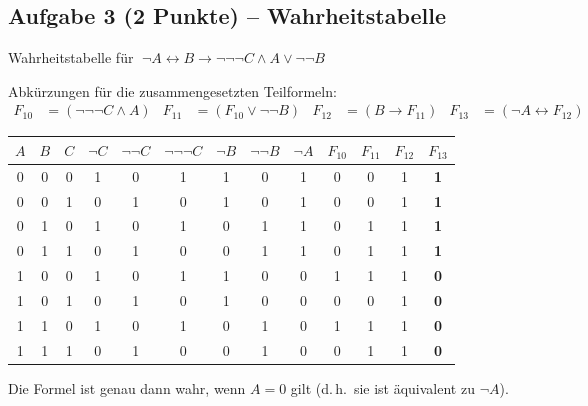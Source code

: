 \documentclass[a4paper,12pt]{article}
\begin{document}
\begin{landscape}
\subsection*{Aufgabe 3 \textnormal{(2 Punkte)} -- Wahrheitstabelle}

Wahrheitstabelle f\"ur
$\;\neg A \leftrightarrow B \to \neg\neg\neg C \wedge A \vee \neg\neg B$

\medskip
Abk\"urzungen f\"ur die zusammengesetzten Teilformeln:
\begin{align*}
F_{10} &= (\neg\neg\neg C \wedge A) &
F_{11} &= (F_{10} \vee \neg\neg B) &
F_{12} &= (B \to F_{11}) &
F_{13} &= (\neg A \leftrightarrow F_{12})
\end{align*}

\begin{center}
\renewcommand{\arraystretch}{1.25}
\begin{tabular}{ccc|cccccc|cccc}
\toprule
$A$ & $B$ & $C$
  & $\neg C$ & $\neg\neg C$ & $\neg\neg\neg C$
  & $\neg B$ & $\neg\neg B$ & $\neg A$
  & $F_{10}$ & $F_{11}$ & $F_{12}$ & $F_{13}$ \\
\midrule
0 & 0 & 0  & 1 & 0 & 1  & 1 & 0 & 1  & 0 & 0 & 1 & \textbf{1} \\
0 & 0 & 1  & 0 & 1 & 0  & 1 & 0 & 1  & 0 & 0 & 1 & \textbf{1} \\
0 & 1 & 0  & 1 & 0 & 1  & 0 & 1 & 1  & 0 & 1 & 1 & \textbf{1} \\
0 & 1 & 1  & 0 & 1 & 0  & 0 & 1 & 1  & 0 & 1 & 1 & \textbf{1} \\
1 & 0 & 0  & 1 & 0 & 1  & 1 & 0 & 0  & 1 & 1 & 1 & \textbf{0} \\
1 & 0 & 1  & 0 & 1 & 0  & 1 & 0 & 0  & 0 & 0 & 1 & \textbf{0} \\
1 & 1 & 0  & 1 & 0 & 1  & 0 & 1 & 0  & 1 & 1 & 1 & \textbf{0} \\
1 & 1 & 1  & 0 & 1 & 0  & 0 & 1 & 0  & 0 & 1 & 1 & \textbf{0} \\
\bottomrule
\end{tabular}
\end{center}

\medskip
Die Formel ist genau dann wahr, wenn $A = 0$ gilt (d.\,h.\ sie ist \"aquivalent zu $\neg A$).

\end{landscape}
\end{document}

